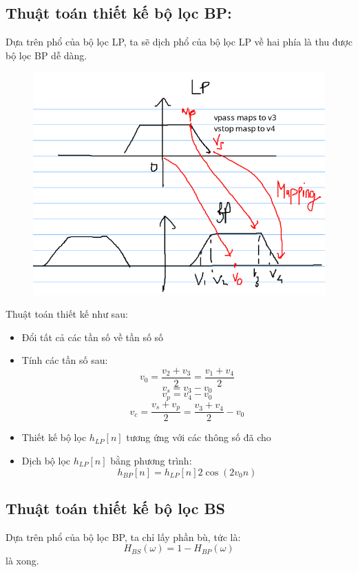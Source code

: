 \documentclass{article}
\begin{document}
\subsection{Thuật toán thiết kế bộ lọc BP:}
Dựa trên phổ của bộ lọc LP, ta sẽ dịch phổ của bộ lọc LP về hai phía là thu được bộ lọc BP dễ dàng.
\begin{figure}[H]
  \begin{center}
  \includegraphics[width=16cm]{map.png}
  \end{center}
\end{figure}
Thuật toán thiết kế như sau: 
\begin{itemize}
\item Đổi tất cả các tần số về tần số số
\item Tính các tần số sau:
$$v_{0}=\frac{v_{2}+v_{3}}{2}=\frac{v_{1}+v_{4}}{2}$$
$$v_{s}=v_{3}-v_{0}$$
$$v_{p}=v_{4}-v_{0}$$
$$v_{c}=\frac{v_{s}+v_{p}}{2}=\frac{v_{3}+v_{4}}{2}-v_{0}$$
\item Thiết kế bộ lọc $h_{LP}[n]$ tương ứng với các thông số đã cho
\item Dịch bộ lọc $h_{LP}[n]$ bằng phương trình:
$$h_{BP}[n]=h_{LP}[n]2\cos{(2v_{0}n)}$$
\end{itemize}
\subsection{Thuật toán thiết kế bộ lọc BS}
Dựa trên phổ của bộ lọc BP, ta chỉ lấy phần bù, tức là:
$$H_{BS}(\omega)=1-H_{BP}(\omega)$$
là xong.
\end{document}
